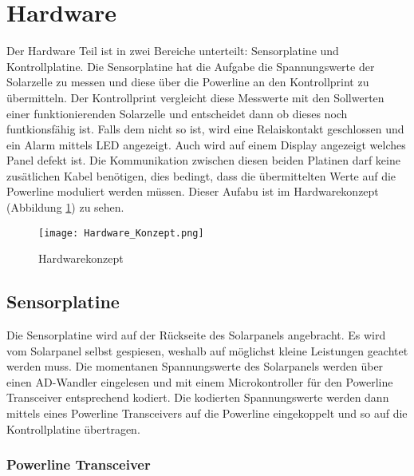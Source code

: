 %
%
%

\section{Hardware}

Der Hardware Teil ist in zwei Bereiche unterteilt: Sensorplatine und Kontrollplatine. Die Sensorplatine hat die Aufgabe die Spannungswerte der Solarzelle zu messen und diese über die Powerline an den Kontrollprint zu übermitteln.
Der Kontrollprint vergleicht diese Messwerte mit den Sollwerten einer funktionierenden Solarzelle und entscheidet dann ob dieses noch funtkionsfähig ist. Falls dem nicht so ist, wird eine Relaiskontakt geschlossen und ein Alarm mittels LED angezeigt. Auch wird auf einem Display angezeigt welches Panel defekt ist. 
Die Kommunikation zwischen diesen beiden Platinen darf keine zusätlichen Kabel benötigen, dies bedingt, dass die übermittelten Werte auf die Powerline moduliert werden müssen. Dieser Aufabu ist im Hardwarekonzept (Abbildung \ref{fig::Hardwarekonzept}) zu sehen.

\begin{figure}[h]
\centering
\texttt{[image: Hardware\_Konzept.png]}%
\caption{Hardwarekonzept}
\label{fig::Hardwarekonzept}%
\end{figure}

\subsection{Sensorplatine}


Die Sensorplatine wird auf der Rückseite des Solarpanels angebracht. Es wird vom Solarpanel selbst gespiesen, weshalb auf möglichst kleine Leistungen geachtet werden muss. Die momentanen Spannungswerte des Solarpanels werden über einen AD-Wandler eingelesen und mit einem Microkontroller für den Powerline Transceiver entsprechend kodiert. Die kodierten Spannungswerte werden dann mittels eines Powerline Transceivers auf die Powerline eingekoppelt und so auf die Kontrollplatine übertragen.

\subsubsection{Powerline Transceiver}

